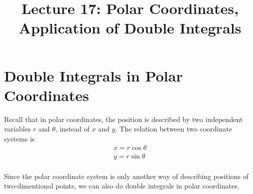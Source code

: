 \documentclass{article}
\title{Lecture 17: Polar Coordinates, Application of Double Integrals}
\author{}
\date{}
\begin{document}
    
\maketitle

\section{Double Integrals in Polar Coordinates}

Recall that in polar coordinates, the position is described by two independent 
variables $r$ and $\theta$, instead of $x$ and $y$. The relation between two 
coordinate systems is
\begin{gather*}
  x = r\cos\theta \\
  y = r\sin\theta \\
\end{gather*}

Since the polar coordinate system is only another way of describing positions of 
two-dimentional points, we can also do double integrals in polar coordinates.
\end{document}
